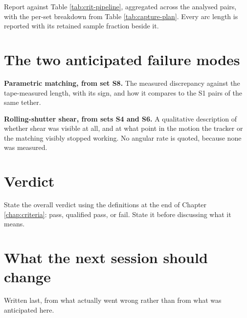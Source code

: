 Report against Table \ref{tab:crit-pipeline}, aggregated across the analysed
pairs, with the per-set breakdown from Table \ref{tab:capture-plan}. Every
arc length is reported with its retained sample fraction beside it.

\section{The two anticipated failure modes}

\textbf{Parametric matching, from set S8.} The measured discrepancy against
the tape-measured length, with its sign, and how it compares to the S1 pairs
of the same tether.

\textbf{Rolling-shutter shear, from sets S4 and S6.} A qualitative
description of whether shear was visible at all, and at what point in the
motion the tracker or the matching visibly stopped working. No angular rate
is quoted, because none was measured.

\section{Verdict}

State the overall verdict using the definitions at the end of Chapter
\ref{chap:criteria}: pass, qualified pass, or fail. State it before
discussing what it means.

\section{What the next session should change}

Written last, from what actually went wrong rather than from what was
anticipated here.

